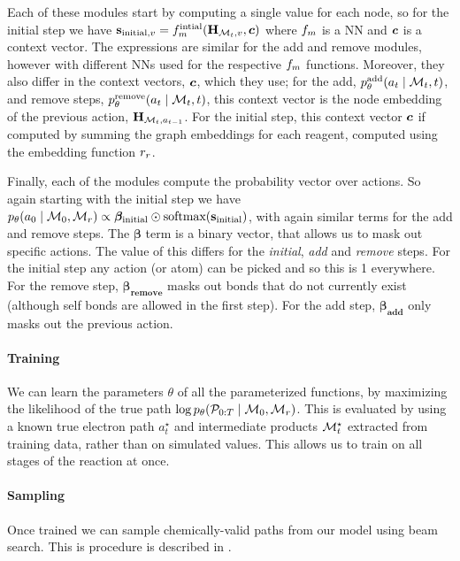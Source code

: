  Each of these modules start by computing  a single value for each node, so for the initial step we have 
 $\textbf{s}_{\textrm{initial}, v} = f_m^\textrm{intial}({\mathbf{H}}_{{\mathcal{M}}_t,v}, \bm{c})$ where $f_m$ is a NN and $\bm{c}$ is a context vector. The expressions are similar for the add and remove modules, however with different NNs used for the respective $f_m$ functions.
 Moreover, they also differ in the context vectors, $\bm{c}$, which they use; for the add, $p_\theta^\textrm{add}(a_t \mid {\mathcal{M}}_t, t)$, and remove steps, $p_\theta^\textrm{remove}(a_t \mid {\mathcal{M}}_t, t)$, this context vector is the node embedding of the previous action, ${\mathbf{H}}_{{\mathcal{M}}_t, a_{t-1}}$. 
 For the initial step, this context vector $\bm{c}$ if computed by summing the graph embeddings for each reagent, computed using the embedding function $r_r$.

Finally, each of the modules compute the probability vector over actions. So again starting with the initial step we have 
$p_\theta(a_0 \mid {\mathcal{M}}_0, {\mathcal{M}}_r) \propto \bm{\beta_\textrm{initial}} \odot \mbox{softmax}(\bm{\textbf{s}_{\textrm{initial}}})$, 
with again similar terms for the add and remove steps.  
The $\bm{\beta}$ term is a binary vector, that allows us to mask out specific actions. The value of this differs for the {\em initial}, {\em add} and {\em remove} steps. 
For the initial step any action (or atom) can be picked and so this is 1 everywhere. For the remove step, $\bm{\beta_\textrm{remove}}$ masks out bonds that do not currently exist (although self bonds are allowed in the first step).
For the add step, $\bm{\beta_\textrm{add}}$ only masks out the previous action.



\paragraph{Training}
We can learn the parameters $\theta$ of all the parameterized functions, by maximizing the likelihood of the true path $\log p_\theta({\mathcal{P}}_{0:T} \mid {\mathcal{M}}_0, {\mathcal{M}}_r)$.
This is evaluated by using a known true electron path $a_t^\star$ and intermediate products ${\mathcal{M}}_t^\star$ extracted from training data,
rather than on simulated values. 
This allows us to train on all stages of the reaction at once.

\paragraph{Sampling}
Once trained we can sample chemically-valid paths from our model using beam search.  This is procedure is described in . 



